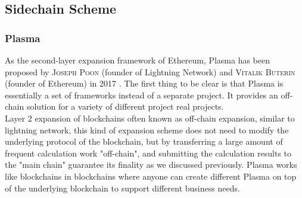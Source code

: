 \subsection{Sidechain Scheme}
\label{sec:side}


\subsubsection{Plasma}
\noindent As the second-layer expansion framework of Ethereum, Plasma has been proposed by \textsc{Joseph Poon} (founder of Lightning Network) and \textsc{Vitalik Buterin} (founder of Ethereum) in 2017 \cite{poon2017plasma}. The first thing to be clear is that Plasma is essentially a set of frameworks instead of a separate project. It provides an off-chain solution for a variety of different project real projects. \\

\noindent Layer 2 expansion of blockchains often known as off-chain expansion, similar to lightning network, this kind of expansion scheme does not need to modify the underlying protocol of the blockchain, but by transferring a large amount of frequent calculation work "off-chain", and submitting the calculation results to the "main chain" guarantee its finality as we discussed previously. Plasma works like blockchains in blockchains where anyone can create different Plasma on top of the underlying blockchain to support different business needs. \\

